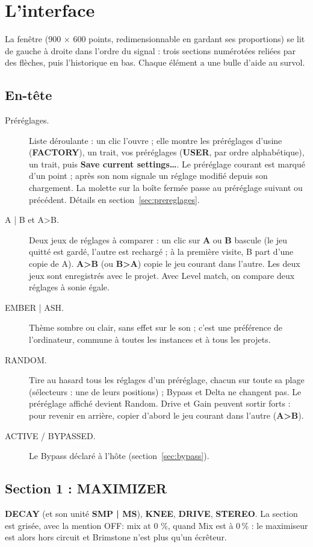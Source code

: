 \documentclass[a4paper,11pt]{article}
\newcommand{\ctl}[1]{\textsf{\textbf{#1}}}   %
\begin{document}
\section{L'interface}

La fenêtre (900 × 600 points, redimensionnable en gardant ses proportions) se lit de gauche à
droite dans l'ordre du signal : trois sections numérotées reliées par des flèches, puis
l'historique en bas. Chaque élément a une bulle d'aide au survol.

\subsection{En-tête}
\begin{description}
\item[Préréglages.] Liste déroulante : un clic l'ouvre ; elle montre les préréglages d'usine
  (\ctl{FACTORY}), un trait, vos préréglages (\ctl{USER}, par ordre alphabétique), un trait, puis
  \ctl{Save current settings\ldots}. Le préréglage courant est marqué d'un point ; \og *\fg{}
  après son nom signale un réglage modifié depuis son chargement. La molette sur la boîte fermée
  passe au préréglage suivant ou précédent. Détails en section~\ref{sec:prereglages}.
\item[A | B et A>B.] Deux jeux de réglages à comparer : un clic sur \ctl{A} ou \ctl{B} bascule
  (le jeu quitté est gardé, l'autre est rechargé ; à la première visite, B part d'une copie de
  A). \ctl{A>B} (ou \ctl{B>A}) copie le jeu courant dans l'autre. Les deux jeux sont
  enregistrés avec le projet. Avec Level match, on compare deux réglages à sonie égale.
\item[EMBER | ASH.] Thème sombre ou clair, sans effet sur le son ; c'est une préférence de
  l'ordinateur, commune à toutes les instances et à tous les projets.
\item[RANDOM.] Tire au hasard tous les réglages d'un préréglage, chacun sur toute sa plage
  (sélecteurs : une de leurs positions) ; Bypass et Delta ne changent pas. Le préréglage affiché
  devient \og Random\fg. Drive et Gain peuvent sortir forts : pour revenir en arrière, copier
  d'abord le jeu courant dans l'autre (\ctl{A>B}).
\item[ACTIVE / BYPASSED.] Le Bypass déclaré à l'hôte (section~\ref{sec:bypass}).
\end{description}

\subsection{Section 1 : MAXIMIZER}
\ctl{DECAY} (et son unité \ctl{SMP | MS}), \ctl{KNEE}, \ctl{DRIVE}, \ctl{STEREO}. La section
est grisée, avec la mention \og OFF: mix at 0 \%\fg, quand Mix est à 0\,\% : le maximiseur
est alors hors circuit et Brimstone n'est plus qu'un écrêteur.
\end{document}

